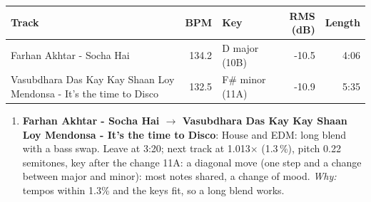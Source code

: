 \begin{tabularx}{\linewidth}{@{}Xrlrr@{}}\toprule
Track & BPM & Key & RMS (dB) & Length \\\midrule
Farhan Akhtar - Socha Hai & 134.2 & D major (10B) & -10.5 & 4:06 \\
Vasubdhara Das Kay Kay Shaan Loy Mendonsa - It's the time to Disco & 132.5 & F\# minor (11A) & -10.9 & 5:35 \\
\bottomrule\end{tabularx}

\begin{enumerate}
\item \textbf{Farhan Akhtar - Socha Hai $\to$ Vasubdhara Das Kay Kay Shaan Loy Mendonsa - It's the time to Disco}: House and EDM: long blend with a bass swap. Leave at 3:20; next track at 1.013$\times$ (1.3\,\%), pitch 0.22 semitones, key after the change 11A: a diagonal move (one step and a change between major and minor): most notes shared, a change of mood. \emph{Why:} tempos within 1.3\% and the keys fit, so a long blend works.
\end{enumerate}
